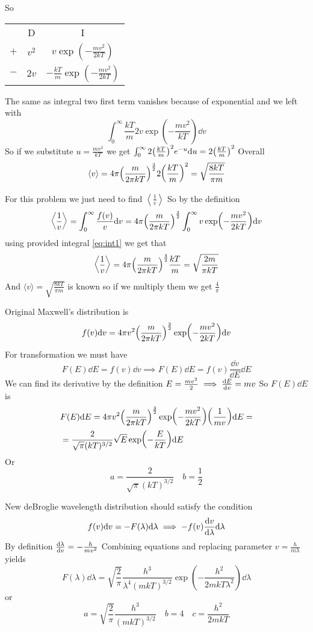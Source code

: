 \documentclass[a4paper, 12pt]{article}
\begin{document}
\begin{sol}
\begin{enumerate}
        So 
        \begin{center}
            \begin{tabular}{ c c c }
                & D & I\\
                $+$&$v^2$& $v\exp(-\frac{mv^2}{2kT})$\\
                $-$&$2v$&$-\frac{kT}{m}\exp(-\frac{mv^2}{2kT})$
            \end{tabular}
        \end{center}
        The same as integral two first term vanishes because of exponential and we left with
        $$\int_0^\infty\frac{kT}{m}2v\exp(-\frac{mv^2}{kT})\dd v$$
        So if we substitute $u=\frac{mv^2}{kT}$ we get $\int_0^\infty2\qty(\frac{kT}{m})^2e^{-u}\dd u=2\qty(\frac{kT}{m})^2$
        Overall $$\langle v\rangle=4\pi \qty(\frac{m}{2\pi kT})^{\frac{3}{2}}2\qty(\frac{kT}{m})^2=\sqrt{\frac{8kT}{\pi m}}$$
    \end{enumerate}
\end{sol}
\begin{sol}
    For this problem we just need to find $\left<\frac{1}{v}\right>$ So by the definition
    $$\left<\frac{1}{v}\right>=\int_0^\infty\frac{f(v)}{v}\dd v=4\pi\qty(\frac{m}{2\pi kT})^{\frac{3}{2}}\int_0^\infty v\exp(-\frac{mv^2}{2kT})\dd v$$
    using provided integral \ref{eq:int1} we get that $$\left<\frac{1}{v}\right>=4\pi\qty(\frac{m}{2\pi kT})^{\frac{3}{2}}\frac{kT}{m}=\sqrt{\frac{2m}{\pi kT}}$$
    And $\langle v \rangle=\sqrt{\frac{8kT}{\pi m}}$ is known so if we multiply them we get $\frac{4}{\pi}$
\end{sol}
\begin{sol}
    Original Maxwell's distribution is 
    $$f(v)\dd v=4\pi v^2\qty(\frac{m}{2\pi kT})^{\frac{3}{2}}\exp(-\frac{mv^2}{2kT})\dd v$$
    For transformation we must have $$F(E)\dd E=f(v)\dd v\implies F(E)\dd E=f(v)\frac{\dd v}{\dd E}\dd E$$
    We can find its derivative by the definition $E=\frac{mv^2}{2}\implies \dv{E}{v}=mv$ So $F(E)\dd E$ is
    \begin{align*}&F(E)\dd E=4\pi v^2\qty(\frac{m}{2\pi kT})^{\frac{3}{2}}\exp(-\frac{mv^2}{2kT})\qty(\frac{1}{mv})\dd E=\\
    &=\frac{2}{\sqrt{\pi}(kT)^{3/2}}\sqrt{E}\exp(-\frac{E}{kT})\dd E\end{align*}
    Or $$a=\frac{2}{\sqrt{\pi}(kT)^{3/2}}\quad b=\frac12$$
\end{sol}
\begin{sol}
    New deBroglie wavelength distribution should satisfy the condition
    $$f(v)\dd v=-F(\lambda)\dd \lambda\implies -f(v)\dv{v}{\lambda}\dd \lambda$$
    By definition $\dv{\lambda}{v}=-\frac{h}{mv^2}$
    Combining equations and replacing parameter $v=\frac{h}{m\lambda}$ yields
    $$F(\lambda)\dd \lambda=\sqrt{\frac{2}{\pi}}\frac{h^3}{\lambda^4(mkT)^{3/2}}\exp(-\frac{h^2}{2mkT\lambda^2})\dd \lambda$$
    or $$a=\sqrt{\frac{2}{\pi}}\frac{h^3}{(mkT)^{3/2}}\quad b=4\quad c=\frac{h^2}{2mkT}$$
\end{sol}
\end{document}
